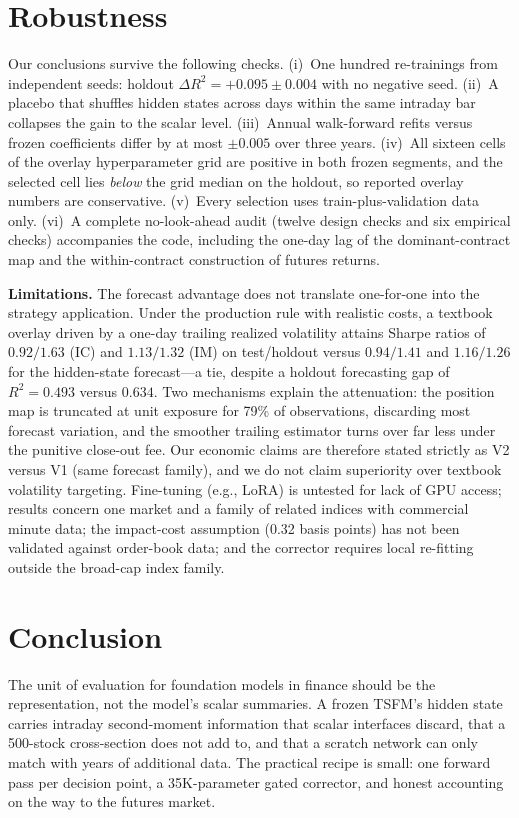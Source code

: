 \documentclass[12pt]{article}
\newcommand{\dR}{\Delta R^2}
\begin{document}
\section{Robustness}\label{sec:robust}
Our conclusions survive the following checks. (i)~One hundred re-trainings
from independent seeds: holdout $\dR = +0.095\pm0.004$ with no negative seed.
(ii)~A placebo that shuffles hidden states across days within the same
intraday bar collapses the gain to the scalar level. (iii)~Annual walk-forward
refits versus frozen coefficients differ by at most $\pm0.005$ over three
years. (iv)~All sixteen cells of the overlay hyperparameter grid are positive
in both frozen segments, and the selected cell lies \emph{below} the grid
median on the holdout, so reported overlay numbers are conservative.
(v)~Every selection uses train-plus-validation data only. (vi)~A complete
no-look-ahead audit (twelve design checks and six empirical checks) accompanies
the code, including the one-day lag of the dominant-contract map and the
within-contract construction of futures returns.

\textbf{Limitations.} The forecast advantage does not translate one-for-one into
the strategy application. Under the production rule with realistic costs, a
textbook overlay driven by a one-day trailing realized volatility attains
Sharpe ratios of $0.92/1.63$ (IC) and $1.13/1.32$ (IM) on test/holdout versus
$0.94/1.41$ and $1.16/1.26$ for the hidden-state forecast---a tie, despite a
holdout forecasting gap of $R^2 = 0.493$ versus $0.634$. Two mechanisms
explain the attenuation: the position map is truncated at unit exposure for
79\% of observations, discarding most forecast variation, and the smoother
trailing estimator turns over far less under the punitive close-out fee. Our
economic claims are therefore stated strictly as V2 versus V1 (same forecast
family), and we do not claim superiority over textbook volatility targeting.
Fine-tuning (e.g., LoRA) is untested for lack of GPU
access; results concern one market and a family of related indices with
commercial minute data; the impact-cost assumption (0.32 basis points) has not
been validated against order-book data; and the corrector requires local
re-fitting outside the broad-cap index family.

\section{Conclusion}\label{sec:conclusion}
The unit of evaluation for foundation models in finance should be the
representation, not the model's scalar summaries. A frozen TSFM's hidden state
carries intraday second-moment information that scalar interfaces discard,
that a 500-stock cross-section does not add to, and that a scratch network can
only match with years of additional data. The practical recipe is small: one
forward pass per decision point, a 35K-parameter gated corrector, and honest
accounting on the way to the futures market.
\end{document}

